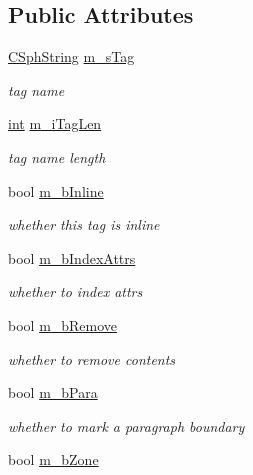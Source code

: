 \subsection*{Public Attributes}
\begin{DoxyCompactItemize}
\item 
\hyperlink{structCSphString}{C\-Sph\-String} \hyperlink{structCSphHTMLStripper_1_1StripperTag__t_aea0ab45a652cec5178633227ffa5c51e}{m\-\_\-s\-Tag}
\begin{DoxyCompactList}\small\item\em tag name \end{DoxyCompactList}\item 
\hyperlink{sphinxexpr_8cpp_a4a26e8f9cb8b736e0c4cbf4d16de985e}{int} \hyperlink{structCSphHTMLStripper_1_1StripperTag__t_a5840fa68d47631c2082731b28c1d81c7}{m\-\_\-i\-Tag\-Len}
\begin{DoxyCompactList}\small\item\em tag name length \end{DoxyCompactList}\item 
bool \hyperlink{structCSphHTMLStripper_1_1StripperTag__t_a22bbfc776856925eec4bb8da6ba522a2}{m\-\_\-b\-Inline}
\begin{DoxyCompactList}\small\item\em whether this tag is inline \end{DoxyCompactList}\item 
bool \hyperlink{structCSphHTMLStripper_1_1StripperTag__t_ad0e2bdb5f610d3e711a069c9c9559a13}{m\-\_\-b\-Index\-Attrs}
\begin{DoxyCompactList}\small\item\em whether to index attrs \end{DoxyCompactList}\item 
bool \hyperlink{structCSphHTMLStripper_1_1StripperTag__t_a8875e17609673d8becab5e9496c21170}{m\-\_\-b\-Remove}
\begin{DoxyCompactList}\small\item\em whether to remove contents \end{DoxyCompactList}\item 
bool \hyperlink{structCSphHTMLStripper_1_1StripperTag__t_a0bb414b75abfa4f37b3c2ac8f19094a4}{m\-\_\-b\-Para}
\begin{DoxyCompactList}\small\item\em whether to mark a paragraph boundary \end{DoxyCompactList}\item 
bool \hyperlink{structCSphHTMLStripper_1_1StripperTag__t_aedc07d9cfa457869152cb5a5f90ddbc8}{m\-\_\-b\-Zone}

\end{DoxyCompactItemize}
